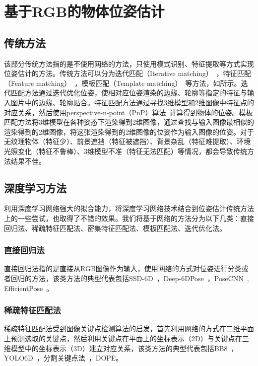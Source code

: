 \section{基于RGB的物体位姿估计}
\subsection{传统方法}
\par 该部分传统方法指的是不使用网络的方法，只使用模式识别、特征提取等方式实现位姿估计的方法。传统方法可以分为迭代匹配（Iterative matching）~\cite{lowe1987three}，特征匹配（Feature matching）~\cite{rublee2011orb}，模板匹配（Template matching）~\cite{hinterstoisser2013model}等方法，如所示。迭代匹配方法通过迭代优化位姿，使相对应位姿渲染的边缘、轮廓等指定的特征与输入图片中的边缘、轮廓贴合。特征匹配方法通过寻找3维模型和2维图像中特征点的对应关系，然后使用perspective-n-point（PnP）算法~\cite{lepetit2009ep}计算得到物体的位姿。模板匹配方法将3维模型在各种姿态下渲染得到2维图像，通过查找与输入图像最相似的渲染得到的2维图像，将这张渲染得到的2维图像的位姿作为输入图像的位姿。对于无纹理物体（特征少）、前景遮挡（特征被遮挡）、背景杂乱（特征难提取）、环境光照变化（特征不鲁棒）、3维模型不准（特征无法匹配）等情况，都会导致传统方法结果不佳。
\subsection{深度学习方法}
\par 利用深度学习网络强大的拟合能力，将深度学习网络技术结合到位姿估计传统方法上的一些尝试，也取得了不错的效果。我们将基于网络的方法分为以下几类：直接回归法、稀疏特征匹配法、密集特征匹配法、模板匹配法、迭代优化法。
\subsubsection{直接回归法}
\par 直接回归法指的是直接从RGB图像作为输入，使用网络的方式对位姿进行分类或者回归的方法，该类方法的典型代表包括SSD-6D~\cite{kehl2017ssd}，Deep-6DPose~\cite{do2018deep}，PoseCNN~\cite{xiang2018posecnn}, EfficientPose~\cite{bukschat2020efficientpose}。
\subsubsection{稀疏特征匹配法}
\par 稀疏特征匹配法受到图像关键点检测算法的启发，首先利用网络的方式在二维平面上预测选取的关键点，然后利用关键点在平面上的坐标表示（2D）与关键点在三维模型中的坐标表示（3D）建立对应关系，该类方法的典型代表包括BB8~\cite{rad2017bb8}，YOLO6D~\cite{tekin2018real}，分割关键点法~\cite{hu2019segmentation}，DOPE。
